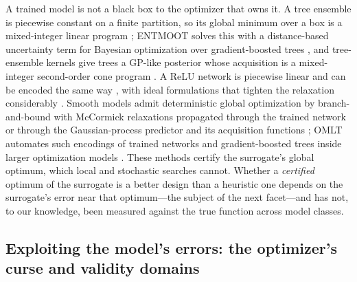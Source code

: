 A trained model is not a black box to the optimizer that owns it. A tree ensemble is piecewise constant on a finite
partition, so its global minimum over a box is a mixed-integer linear program \cite{misic2020optimization}; ENTMOOT
solves this with a distance-based uncertainty term for Bayesian optimization over gradient-boosted trees
\cite{thebelt2021entmoot}, and tree-ensemble kernels give trees a GP-like posterior whose acquisition is a mixed-integer
second-order cone program \cite{thebelt2022tree}. A ReLU network is piecewise linear and can be encoded the same way
\cite{fischetti2018deep}, with ideal formulations that tighten the relaxation considerably \cite{anderson2020strong}.
Smooth models admit deterministic global optimization by branch-and-bound with McCormick relaxations propagated
through the trained network \cite{schweidtmann2019deterministic} or through the Gaussian-process predictor and its
acquisition functions \cite{schweidtmann2021deterministic}; OMLT automates such encodings of trained networks and
gradient-boosted trees inside larger optimization models \cite{ceccon2022omlt}. These methods certify the surrogate's
global optimum, which local and stochastic searches cannot. Whether a \emph{certified} optimum of the surrogate is a
better design than a heuristic one depends on the surrogate's error near that optimum---the subject of the next
facet---and has not, to our knowledge, been measured against the true function across model classes.

\subsection{Exploiting the model's errors: the optimizer's curse and validity domains}

